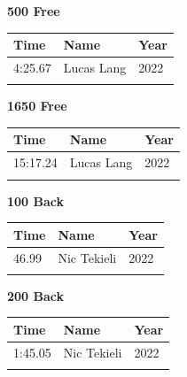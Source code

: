 \hfill
\begin{minipage}[t]{0.48\textwidth}
\centering
\textbf{\textcolor{teamprimary}{500 Free}}\par
\vspace{0.5em}
\centering
\small
\renewcommand{\arraystretch}{1.0}
\setlength{\tabcolsep}{4pt}
\begin{tabular}{@{}p{1.8cm}p{3.0cm}p{1.0cm}@{}}
\toprule
\textbf{Time} & \textbf{Name} & \textbf{Year} \\
\midrule
4:25.67 & Lucas Lang & 2022 \\
\bottomrule
\vspace{0.5em}
\end{tabular}
\end{minipage}
\vspace{1.2em}
\noindent\begin{minipage}[t]{0.48\textwidth}
\centering
\textbf{\textcolor{teamprimary}{1650 Free}}\par
\vspace{0.5em}
\centering
\small
\renewcommand{\arraystretch}{1.0}
\setlength{\tabcolsep}{4pt}
\begin{tabular}{@{}p{1.8cm}p{3.0cm}p{1.0cm}@{}}
\toprule
\textbf{Time} & \textbf{Name} & \textbf{Year} \\
\midrule
15:17.24 & Lucas Lang & 2022 \\
\bottomrule
\vspace{0.5em}
\end{tabular}
\end{minipage}
\hfill
\begin{minipage}[t]{0.48\textwidth}
\centering
\textbf{\textcolor{teamprimary}{100 Back}}\par
\vspace{0.5em}
\centering
\small
\renewcommand{\arraystretch}{1.0}
\setlength{\tabcolsep}{4pt}
\begin{tabular}{@{}p{1.8cm}p{3.0cm}p{1.0cm}@{}}
\toprule
\textbf{Time} & \textbf{Name} & \textbf{Year} \\
\midrule
46.99 & Nic Tekieli & 2022 \\
\bottomrule
\vspace{0.5em}
\end{tabular}
\end{minipage}
\vspace{1.2em}
\noindent\begin{minipage}[t]{0.48\textwidth}
\centering
\textbf{\textcolor{teamprimary}{200 Back}}\par
\vspace{0.5em}
\centering
\small
\renewcommand{\arraystretch}{1.0}
\setlength{\tabcolsep}{4pt}
\begin{tabular}{@{}p{1.8cm}p{3.0cm}p{1.0cm}@{}}
\toprule
\textbf{Time} & \textbf{Name} & \textbf{Year} \\
\midrule
1:45.05 & Nic Tekieli & 2022 \\
\bottomrule
\vspace{0.5em}
\end{tabular}
\end{minipage}
